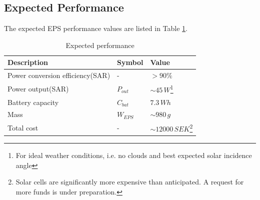 \subsection{Expected Performance}
The expected \ac{EPS} performance values are listed in Table \ref{tab:expected_performance}.
%
\begin{table}[H]
\centering
\caption{Expected performance}
\label{tab:expected_performance}
\begin{minipage}{\textwidth}
\begin{tabular}{p{}p{}p{}}
\hline
\textbf{Description} & \textbf{Symbol} & \textbf{Value}\\
\hline
Power conversion efficiency(SAR) & - & $>90\%$\\
Power output(SAR) & $P_{out}$ & $\sim 45\,W$\footnote{For ideal weather conditions, i.e. no clouds and best expected solar incidence angle}\\
Battery capacity & $C_{bat}$ & $7.3\,Wh$\\
Mass & $W_{EPS}$ & $\sim980\,g$\\
Total cost & - & $\sim12000\,SEK$\footnote{Solar cells are significantly more expensive than anticipated. A request for more funds is under preparation.}\\
\hline
\end{tabular}\par
\vspace{-0.75\skip\footins}
\renewcommand{\footnoterule}{}
\end{minipage}
\end{table}
%
%
